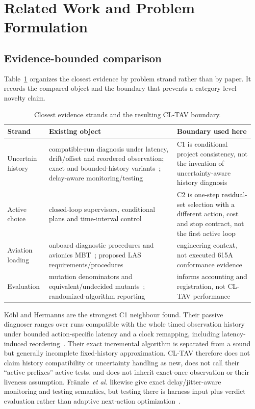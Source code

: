 \section{Related Work and Problem Formulation}
\label{sec:related}

\subsection{Evidence-bounded comparison}
Table~\ref{tab:related} organizes the closest evidence by problem strand rather
than by paper. It records the compared object and the boundary that prevents a
category-level novelty claim.

\begin{table}[!ht]
\caption{Closest evidence strands and the resulting CL-TAV boundary.}
\label{tab:related}
\centering
\footnotesize
\begin{tabular}{@{}p{}p{}p{}@{}}
\hline
Strand & Existing object & Boundary used here \\
\hline
Uncertain history & compatible-run diagnosis under latency, drift/offset and reordered observation; exact and bounded-history variants~\cite{koehl2023}; delay-aware monitoring/testing~\cite{fraenzle2026} & C1 is conditional project consistency, not the invention of uncertainty-aware history diagnosis \\
Active choice & closed-loop supervisors, conditional plans and time-interval control~\cite{sampath1998,chanthery2009,hu2020,miao2025} & C2 is one-step residual-set selection with a different action, cost and stop contract, not the first active loop \\
Aviation loading & onboard diagnostic procedures and avionics MBT~\cite{chanthery2019,efkemann2011,sartaj2021}; proposed LAS requirements/procedures~\cite{marques2021} & engineering context, not executed 615A conformance evidence \\
Evaluation & mutation denominators and equivalent/undecided mutants~\cite{jia2011,gruen2009}; randomized-algorithm reporting~\cite{arcuri2011} & informs accounting and registration, not CL-TAV performance \\
\hline
\end{tabular}
\end{table}

Köhl and Hermanns are the strongest C1 neighbour found. Their passive diagnoser
ranges over runs compatible with the whole timed observation history under
bounded action-specific latency and a clock remapping, including latency-induced
reordering~\cite{koehl2023}. Their exact incremental algorithm is separated from
a sound but generally incomplete fixed-history approximation. CL-TAV therefore
does not claim history compatibility or uncertainty handling as new, does not
call their ``active prefixes'' active tests, and does not inherit exact-once
observation or their liveness assumption. Fränzle~\textit{et al.} likewise give
exact delay/jitter-aware monitoring and testing semantics, but testing there is
harness input plus verdict evaluation rather than adaptive next-action
optimization~\cite{fraenzle2026}.

